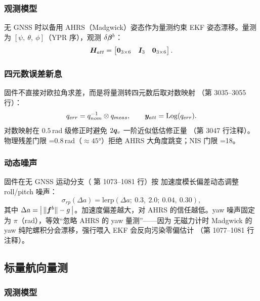 \subsubsection{观测模型}

无 GNSS 时以备用 AHRS（Madgwick）姿态作为量测约束 EKF 姿态漂移。量测为
$[\psi,\ \theta,\ \phi]$（YPR 序），观测 $\delta\boldsymbol{\beta}^b$：
\begin{equation}
  \boldsymbol{H}_{att} = \begin{bmatrix} \boldsymbol{0}_{3\times6} & \boldsymbol{I}_3 &
    \boldsymbol{0}_{3\times6} \end{bmatrix}.
  \label{eq:H-att}
\end{equation}
\subsubsection{四元数误差新息}

固件不直接对欧拉角求差，而是将量测转四元数后取对数映射
（第 3035--3055 行）：
\begin{equation}
  q_{err} = q_{nom}^{-1} \otimes q_{meas}, \qquad
  \boldsymbol{y}_{att} = \operatorname{Log}(q_{err}).
  \label{eq:y-att}
\end{equation}
对数映射在 $0.5$\,rad 级修正时避免 $2\boldsymbol{q}_v$ 一阶近似低估修正量
（第 3047 行注释）。物理残差门限
=0.8\,rad（$\approx45°$）拒绝 AHRS
大角度跳变；NIS 门限 =18。

\subsubsection{动态噪声}

固件在无 GNSS 运动分支（ 第 1073--1081 行）按
加速度模长偏差动态调整 roll/pitch 噪声：
\begin{equation}
  \sigma_{rp}(\Delta a) = \text{lerp}\left(\Delta a;\ 0.3,\ 2.0;\ 0.04,\ 0.30\right),
  \label{eq:att-noise-dyn}
\end{equation}
其中 $\Delta a = \left|\,\|\boldsymbol{f}^b\| - g\,\right|$。加速度偏差越大，对 AHRS
的信任越低。yaw 噪声固定为 $\pi$（rad），等效``忽略 AHRS 的 yaw 量测''——因为
无磁力计时 Madgwick 的 yaw 纯陀螺积分会漂移，强行喂入 EKF 会反向污染零偏估计
（第 1077--1081 行注释）。

\subsection{标量航向量测}

\subsubsection{观测模型}

